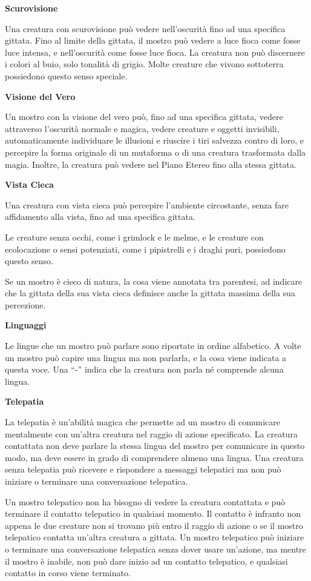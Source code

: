 \begin{multicols}{2}
\textbf{Scurovisione}

Una creatura con scurovisione può vedere nell'oscurità fino ad una
specifica gittata. Fino al limite della gittata, il mostro può vedere a
luce fioca come fosse luce intensa, e nell'oscurità come fosse luce
fioca. La creatura non può discernere i colori al buio, solo tonalità di
grigio. Molte creature che vivono sottoterra possiedono questo senso
speciale.

\textbf{Visione del Vero}

Un mostro con la visione del vero può, fino ad una specifica gittata,
vedere attraverso l'oscurità normale e magica, vedere creature e oggetti
invisibili, automaticamente individuare le illusioni e riuscire i tiri
salvezza contro di loro, e percepire la forma originale di un mutaforma
o di una creatura trasformata dalla magia. Inoltre, la creatura può
vedere nel Piano Etereo fino alla stessa gittata.

\textbf{Vista Cieca}

Una creatura con vista cieca può percepire l'ambiente circostante, senza
fare affidamento alla vista, fino ad una specifica gittata.

Le creature senza occhi, come i grimlock e le melme, e le creature con
ecolocazione o sensi potenziati, come i pipistrelli e i draghi puri,
possiedono questo senso.

Se un mostro è cieco di natura, la cosa viene annotata tra parentesi, ad
indicare che la gittata della sua vista cieca definisce anche la gittata
massima della sua percezione.



\textbf{Linguaggi}

Le lingue che un mostro può parlare sono riportate in ordine alfabetico.
A volte un mostro può capire una lingua ma non parlarla, e la cosa viene
indicata a questa voce. Una ``-'' indica che la creatura non parla né
comprende alcuna lingua.

\textbf{Telepatia}

La telepatia è un'abilità magica che permette ad un mostro di comunicare
mentalmente con un'altra creatura nel raggio di azione specificato. La
creatura contattata non deve parlare la stessa lingua del mostro per
comunicare in questo modo, ma deve essere in grado di comprendere almeno
una lingua. Una creatura senza telepatia può ricevere e rispondere a
messaggi telepatici ma non può iniziare o terminare una conversazione
telepatica.

Un mostro telepatico non ha bisogno di vedere la creatura contattata e
può terminare il contatto telepatico in qualsiasi momento. Il contatto è
infranto non appena le due creature non si trovano più entro il raggio
di azione o se il mostro telepatico contatta un'altra creatura a
gittata. Un mostro telepatico può iniziare o terminare una conversazione
telepatica senza dover usare un'azione, ma mentre il mostro è inabile,
non può dare inizio ad un contatto telepatico, e qualsiasi contatto in
corso viene terminato.


\end{multicols}
